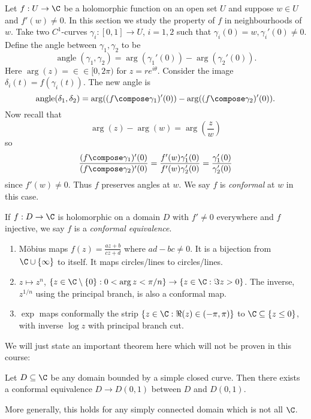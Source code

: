 \documentclass[a4paper]{article}
\begin{document}
Let \(f: U \to \C\) be a holomorphic function on an open set \(U\) and suppose \(w \in U\) and \(f'(w) \neq 0\). In this section we study the property of \(f\) in neighbourhoods of \(w\). Take two \(C^1\)-curves \(\gamma_i: [0, 1] \to U\), \(i = 1, 2\) such that \(\gamma_i(0) = w, \gamma_i'(0) \neq 0\). Define the angle between \(\gamma_1, \gamma_2\) to be
\[
  \operatorname{angle}(\gamma_1, \gamma_2) = \arg(\gamma_1'(0)) - \arg(\gamma_2'(0)).
\]
Here \(\arg(z) = \in \in [0, 2\pi)\) for \(z = re^{i\theta}\). Consider the image \(\delta_i(t) = f(\gamma_i(t))\). The new angle is
\[
  \operatorname{angle}(\delta_1, \delta_2) = \arg((f \compose \gamma_1)'(0)) - \arg((f \compose \gamma_2)'(0)).
\]
Now recall that
\[
  \arg(z) - \arg(w) = \arg(\frac{z}{w})
\]
so
\[
  \frac{(f \compose \gamma_1)'(0)}{(f \compose \gamma_2)'(0)}
  = \frac{f'(w)\gamma_1'(0)}{f'(w)\gamma_2'(0)}
  = \frac{\gamma_1'(0)}{\gamma_2'(0)}
\]
since \(f'(w) \neq 0\). Thus \(f\) preserves angles at \(w\). We say \(f\) is \emph{conformal} at \(w\) in this case.

\begin{definition}
  If \(f: D \to \C\) is holomorphic on a domain \(D\) with \(f' \neq 0\) everywhere and \(f\) injective, we say \(f\) is a \emph{conformal equivalence}.
\end{definition}

\begin{eg}\leavevmode
  \begin{enumerate}
  \item Möbius maps \(f(z) = \frac{az + b}{cz + d}\) where \(ad - bc \neq 0\). It is a bijection from \(\C \cup \{\infty\}\) to itself. It maps circles/lines to circles/lines.
  \item \(z \mapsto z^n\), \(\{z \in \C\setminus\{0\}: 0 < \arg z < \pi/n\} \to \{z \in \C: \Im z > 0\}\). The inverse, \(z^{1/n}\) using the principal branch, is also a conformal map.
  \item \(\exp\) maps conformally the strip \(\{z \in \C: \Re(z) \in (-\pi, \pi)\}\) to \(\C\subseteq\{z \leq 0\}\), with inverse \(\log z\) with principal branch cut.
  \end{enumerate}
\end{eg}

We will just state an important theorem here which will not be proven in this course:

\begin{theorem}
  Let \(D \subseteq \C\) be any domain bounded by a simple closed curve. Then there exists a conformal equivalence \(D \to D(0, 1)\) between \(D\) and \(D(0, 1)\).

  More generally, this holds for any simply connected domain which is not all \(\C\).
\end{theorem}
\end{document}

